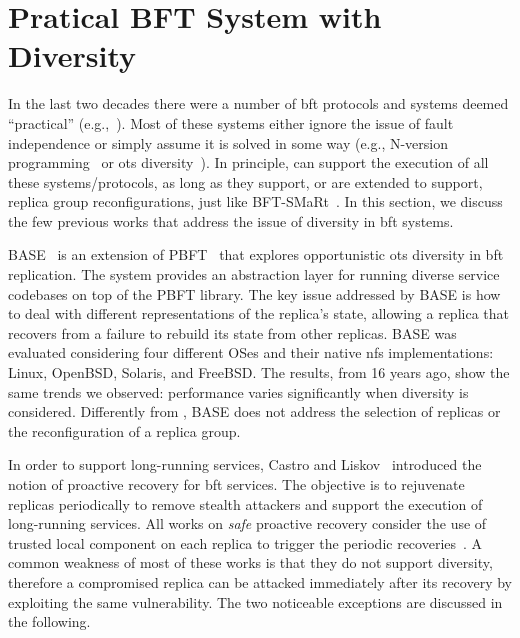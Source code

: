 \section{Pratical BFT System with Diversity}


In the last two decades there were a number of \gls{bft} protocols and systems deemed ``practical'' (e.g.,~\cite{Castro:2002,Kotla:2010,Veronese:2013,Aublin:2015,Behl:2015,Behl:2017,Liu:2016,Yin:2003}).
Most of these systems either ignore the issue of fault independence or simply assume it is solved in some way (e.g., N-version programming~\cite{Chen:1995} or \gls{ots} diversity~\cite{Gashi:2007,Garcia:2014}).
In principle, \system can support the execution of all these systems/protocols, as long as they support, or are extended to support, replica group reconfigurations, just like BFT-SMaRt~\cite{Bessani:2014}.
In this section, we discuss the few previous works that address the issue of diversity in \gls{bft} systems. 

BASE~\cite{Rodrigues:2001} is an extension of PBFT~\cite{Castro:1999} that explores opportunistic \gls{ots} diversity in \gls{bft} replication. 
The system provides an abstraction layer for running diverse service codebases on top of the PBFT library.
The key issue addressed by BASE is how to deal with different representations of the replica's state, allowing a replica that recovers from a failure to rebuild its state from other replicas. 
BASE was evaluated considering four different OSes and their native \gls{nfs} implementations: Linux, OpenBSD, Solaris, and FreeBSD.
The results, from 16 years ago, show the same trends we observed: performance varies significantly when diversity is considered.
Differently from \system, BASE does not address the selection of replicas or the reconfiguration of a replica group.

In order to support long-running services, Castro and Liskov~\cite{Castro:2002} introduced the notion of proactive recovery for \gls{bft} services. 
The objective is to rejuvenate replicas periodically to remove stealth attackers and support the execution of long-running services. 
All works on \emph{safe} proactive recovery consider the use of trusted local component on each replica to trigger the periodic recoveries~\cite{Castro:2002,Sousa:2010,Roeder:2010,Platania:2014,Distler:2011}.
A common weakness of most of these works is that they do not support diversity, therefore a compromised replica can be attacked immediately after its recovery by exploiting the same vulnerability.
The two noticeable exceptions are discussed in the following.

